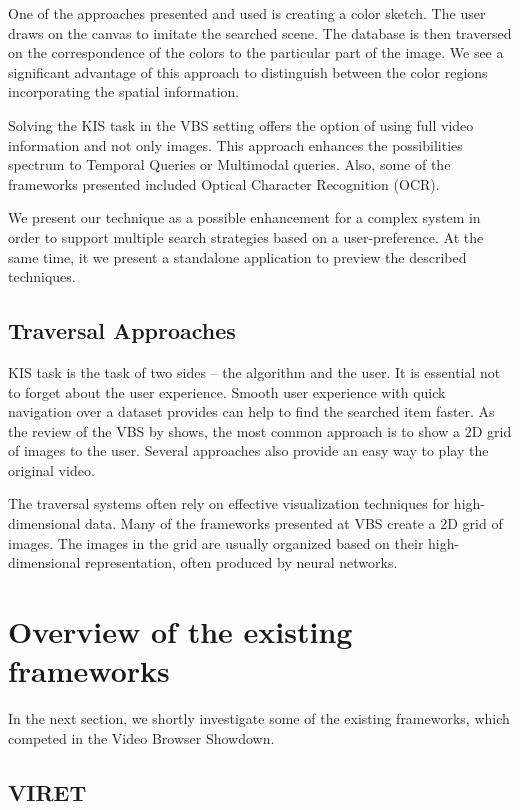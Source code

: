 One of the approaches presented and used is creating a color sketch. The user draws on the canvas to imitate the searched scene. The database is then traversed on the correspondence of the colors to the particular part of the image. We see a significant advantage of this approach to distinguish between the color regions incorporating the spatial information.
 
Solving the KIS task in the VBS setting offers the option of using full video information and not only images. This approach enhances the possibilities spectrum to Temporal Queries or Multimodal queries. Also, some of the frameworks presented included Optical Character Recognition (OCR).

We present our technique as a possible enhancement for a complex system in order to support multiple search strategies based on a user-preference. At the same time, it we present a standalone application to preview the described techniques.

\subsection{Traversal Approaches}

KIS task is the task of two sides -- the algorithm and the user. It is essential not to forget about the user experience. Smooth user experience with quick navigation over a dataset provides can help to find the searched item faster. As the review of the VBS by \cite{rossetto2020interactive} shows, the most common approach is to show a 2D grid of images to the user. Several approaches also provide an easy way to play the original video. 

The traversal systems often rely on effective visualization techniques for high-dimensional data. Many of the frameworks presented at VBS create a 2D grid of images. The images in the grid are usually organized based on their high-dimensional representation, often produced by neural networks. 


\section{Overview of the existing frameworks}

In the next section, we shortly investigate some of the existing frameworks, which competed in the Video Browser Showdown. 

\subsection{VIRET}

